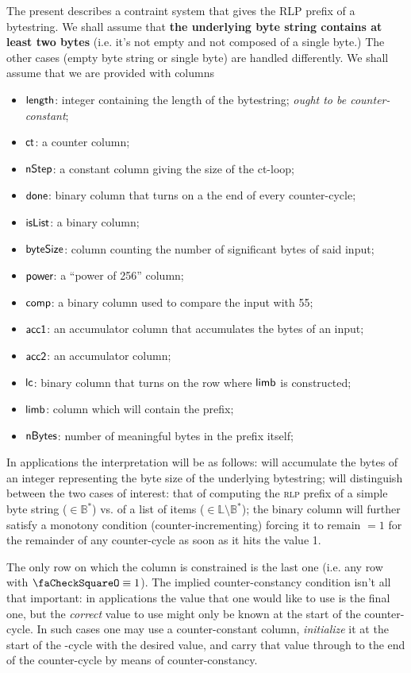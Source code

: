 The present describes a contraint system that gives the RLP prefix of a bytestring. 
We shall assume that \textbf{the underlying byte string contains at least two bytes} (i.e. it's not empty and not composed of a single byte.) The other cases (empty byte string or single byte) are handled differently. We shall assume that we are provided with columns
\begin{itemize}
	\item $\textsf{length}$: integer containing the length of the bytestring; \emph{ought to be counter-constant};
	\item $\textsf{ct}$: a counter column;
	\item $\textsf{nStep}$: a constant column giving the size of the ct-loop;
	\item $\textsf{done}$: binary column that turns on a the end of every counter-cycle;
	\item $\textsf{isList}$: a binary column;
	\item $\textsf{byteSize}$: column counting the number of significant bytes of said input;
	\item $\textsf{power}$: a ``power of 256'' column;
	\item $\textsf{comp}$: a binary column used to compare the input with 55;
	\item $\textsf{acc1}$: an accumulator column that accumulates the bytes of an input;
	\item $\textsf{acc2}$: an accumulator column;
	\item $\textsf{lc}$: binary column that turns on the row where $\textsf{limb}$ is constructed;
	\item $\textsf{limb}$: column which will contain the prefix; 
	\item $\textsf{nBytes}$: number of meaningful bytes in the prefix itself;
\end{itemize}
In applications the interpretation will be as follows:
 will accumulate the bytes of an integer  representing the byte size of the underlying bytestring;
 will distinguish between the two cases of interest: that of computing the \textsc{rlp} prefix of a simple byte string ($\in\mathbb{B}^*$) vs. of a list of items ($\in\mathbb{L} \setminus \mathbb{B}^*$);
the binary column  will further satisfy a monotony condition (counter-incrementing) forcing it to remain $=1$ for the remainder of any counter-cycle as soon as it hits the value 1.

\saNote{}\label{rlp patterns: bytestring prefix: note: purpose of counter constancy of length} The only row on which the  column is constrained is the last one (i.e. any row with $\done \equiv 1$). The implied counter-constancy condition isn't all that important: in applications the value that one would like to use is the final one, but the \emph{correct} value to use might only be known at the start of the counter-cycle. In such cases one may use a counter-constant column, \emph{initialize} it at the start of the \ct{}-cycle with the desired value, and carry that value through to the end of the counter-cycle by means of counter-constancy.

